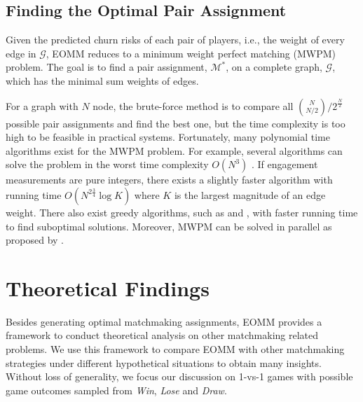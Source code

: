 \vspace{2mm}

\subsection{Finding the Optimal Pair Assignment}
Given the predicted churn risks of each pair of players, i.e., the weight of every edge in $\mathcal{G}$, EOMM reduces to a minimum weight perfect matching (MWPM) problem. The goal is to find a pair assignment, $\mathcal{M}^*$, on a complete graph, $\mathcal{G}$, which has the minimal sum weights of edges.

For a graph with $N$ node, the brute-force method is to compare all $\binom N{N/2} / 2^{\frac{N}{2}}$ possible pair assignments and find the best one, but the time complexity is too high to be feasible in practical systems. Fortunately, many polynomial time algorithms exist for the MWPM problem. For example, several algorithms can solve the problem in the worst time complexity $O(N^3)$ \cite{gabow1974implementation,lawler2001combinatorial}. If engagement measurements are pure integers, there exists a slightly faster algorithm \cite{gabow1985scaling} with running time $O(N^{2\frac{3}{4}}\log K)$ where $K$ is the largest magnitude of an edge weight. There also exist greedy algorithms, such as \cite{drake2003simple} and \cite{duan2014linear}, with faster running time to find suboptimal solutions. Moreover, MWPM can be solved in parallel as proposed by \cite{osiakwan1990maximum}.

\vspace{3mm}

\section{Theoretical Findings}\label{sec:findings}
Besides generating optimal matchmaking assignments, EOMM provides a framework to conduct theoretical analysis on other matchmaking related problems. We use this framework to compare EOMM with other matchmaking strategies under different hypothetical situations to obtain many insights. Without loss of generality, we focus our discussion on 1-vs-1 games with possible game outcomes sampled from \emph{Win}, \emph{Lose} and \emph{Draw}.

